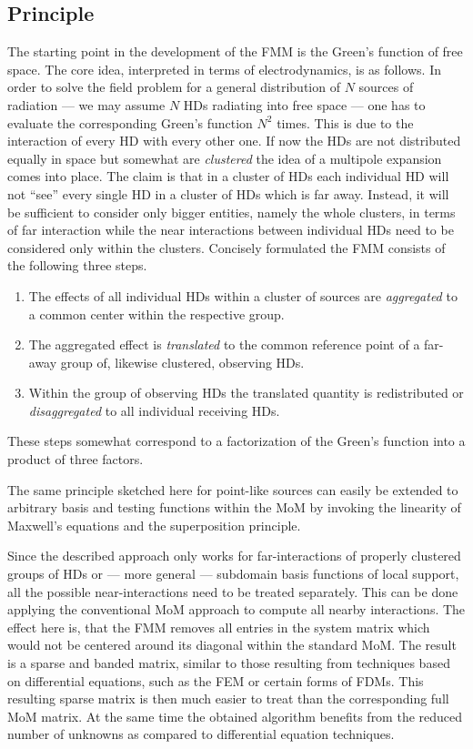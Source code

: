 \subsection{Principle}

The starting point in the development of the \ac{FMM} is the Green's function
of free space.
The core idea, interpreted in terms of electrodynamics, is as follows.
In order to solve the field problem for a general distribution of $N$ sources
of radiation --- we may assume $N$ \acp{HD} radiating into free space ---
one has to evaluate the corresponding Green's function $N^2$ times.
This is due to the interaction of every \ac{HD} with every other one.
If now the \acp{HD} are not distributed equally in space but somewhat are
\emph{clustered} the idea of a multipole expansion 
\cite[9.7]{Jackson2013} \cite[7.10]{vanBladel2007} comes into place.
The claim is that in a cluster of \acp{HD} each individual \ac{HD} will not
\enquote{see} every single \ac{HD} in a cluster of \acp{HD} which is far away.
Instead, it will be sufficient to consider only bigger entities, namely the
whole clusters, in terms of far interaction while the near interactions
between individual \acp{HD} need to be considered only within the clusters.
Concisely formulated the \ac{FMM} consists of the following three steps. 
\begin{enumerate}
	\item The effects of all individual \acp{HD} within a cluster of sources
	are \emph{aggregated} to a common center within the respective group. 
	\item The aggregated effect is \emph{translated} to the common reference
	point of a far-away group of, likewise clustered, observing \acp{HD}.
	\item Within the group of observing \acp{HD} the translated quantity is
	redistributed or \emph{disaggregated} to all individual receiving \acp{HD}.
\end{enumerate}

These steps somewhat correspond to a factorization of the Green's function
into a product of three factors.

The same principle sketched here for point-like sources can easily be extended
to arbitrary basis and testing functions within the \ac{MoM} by invoking
the linearity of Maxwell's equations and the superposition principle.

Since the described approach only works for far-interactions of properly
clustered groups of \acp{HD} or --- more general --- subdomain basis functions 
of local support, all the possible near-interactions need to be treated
separately.
This can be done applying the conventional \ac{MoM} approach to compute all
nearby interactions.
The effect here is, that the \ac{FMM} removes all entries in the system matrix
which would not be centered around its diagonal within the standard \ac{MoM}.
The result is a sparse and banded matrix, similar to those resulting from
techniques based on differential equations, such as the \ac{FEM} or certain
forms of \acp{FDM}.
This resulting sparse matrix is then much easier to treat than the corresponding
full \ac{MoM} matrix. At the same time the obtained algorithm benefits from the
reduced number of unknowns as compared to differential equation techniques.

